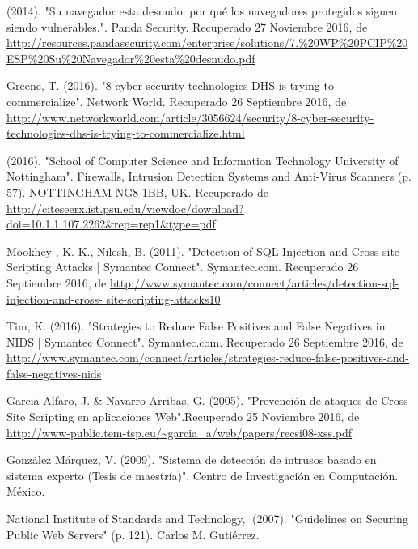\begin{thebibliography}{99}
 (2014). "Su navegador esta desnudo: por qué los navegadores protegidos siguen siendo vulnerables.". Panda Security. Recuperado 27 Noviembre 2016, de \url{http://resources.pandasecurity.com/enterprise/solutions/7.\%20WP\%20PCIP\%20ESP\%20Su\%20Navegador\%20esta\%20desnudo.pdf}

 Greene, T. (2016). "8 cyber security technologies DHS is trying to commercialize". Network World. Recuperado 26 Septiembre 2016, de \url{http://www.networkworld.com/article/3056624/security/8-cyber-security-technologies-dhs-is-trying-to-commercialize.html}

 (2016). "School of Computer Science and Information Technology University of Nottingham". Firewalls, Intrusion Detection Systems and Anti-Virus Scanners (p. 57). NOTTINGHAM NG8 1BB, UK. Recuperado de \url{http://citeseerx.ist.psu.edu/viewdoc/download?doi=10.1.1.107.2262\&rep=rep1\&type=pdf}

 Mookhey , K. K., Nilesh, B. (2011). "Detection of SQL Injection and Cross-site Scripting Attacks | Symantec Connect".
Symantec.com. Recuperado 26 Septiembre 2016, de \url{http://www.symantec.com/connect/articles/detection-sql-injection-and-cross- site-scripting-attacks10}

 Tim, K. (2016). "Strategies to Reduce False Positives and False Negatives in NIDS | Symantec Connect". Symantec.com.
Recuperado 26 Septiembre 2016, de \url{http://www.symantec.com/connect/articles/strategies-reduce-false-positives-and-false-negatives-nids}

 Garcia-Alfaro, J. \& Navarro-Arribas, G. (2005). "Prevención de ataques de Cross-Site Scripting en aplicaciones Web".Recuperado 25 Noviembre 2016, de \url{http://www-public.tem-tsp.eu/~garcia\_a/web/papers/recsi08-xss.pdf}

 González Márquez, V. (2009). "Sistema de detección de intrusos basado en sistema experto (Tesis de maestría)". Centro de Investigación en Computación. México.

 National Institute of Standards and Technology,. (2007). "Guidelines on Securing Public Web Servers" (p. 121). Carlos M. Gutiérrez.

\end{thebibliography}

